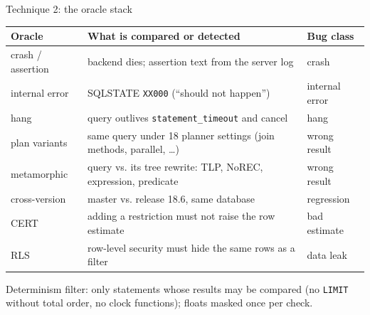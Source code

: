 \documentclass[aspectratio=169,10pt]{beamer}
\begin{document}
\begin{frame}{Technique 2: the oracle stack}
\small
\begin{tabularx}{\linewidth}{@{}lXl@{}}
\toprule
Oracle & What is compared or detected & Bug class \\
\midrule
crash / assertion & backend dies; assertion text from the server log & crash \\
internal error & SQLSTATE \texttt{XX000} (``should not happen'') & internal error \\
hang & query outlives \texttt{statement\_timeout} and cancel & hang \\
plan variants & same query under 18 planner settings (join methods, parallel, \dots) & wrong result \\
metamorphic & query vs. its \alert{tree rewrite}: TLP, NoREC, expression, predicate & wrong result \\
cross-version & master vs. release 18.6, same database & regression \\
CERT & adding a restriction must not raise the row estimate & bad estimate \\
RLS & row-level security must hide the same rows as a filter & data leak \\
\bottomrule
\end{tabularx}

\medskip
Determinism filter: only statements whose results may be compared (no \texttt{LIMIT} without total order, no clock functions); floats masked once per check.
\end{frame}
\end{document}
